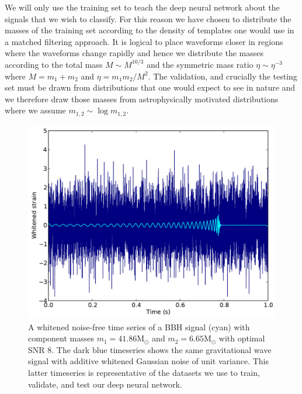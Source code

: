 \documentclass[%
showpacs,
 amsmath,amssymb,
 aps,
 twocolumn,
 prl,
 reprint,
floatfix,
]{revtex4-1}
\begin{document}
%
%
We will only use the training set to teach the deep neural network about the
signals that we wish to classify. For this reason we have chosen to distribute
the masses of the training set according to the density of templates one would
use in a matched filtering approach. It is logical to place waveforms closer in
regions where the waveforms change rapidly and hence we distribute the masses
according to the total mass $M\sim M^{10/3}$ and the symmetric mass ratio
$\eta\sim \eta^{-3}$ where $M=m_{1}+m_{2}$ and $\eta=m_{1}m_{2}/M^{2}$. The
validation, and crucially the testing set must be drawn from distributions that
one would expect to see in nature and we therefore draw those masses from
astrophysically motivated distributions where we assume $m_{1,2}\sim
\log{m_{1,2}}$.   


\begin{figure} 
\includegraphics[width=\columnwidth]{figures/waveform.pdf}
\caption{\label{fig:waveform} A whitened noise-free time series of a \ac{BBH}
signal (cyan) with component masses $m_{1}=41.86\mathrm{M}_{\odot}$ and $m_{2}=6.65\mathrm{M}_{\odot}$
with optimal \ac{SNR} 8. The dark blue timeseries shows the
same gravitational wave signal with additive whitened Gaussian noise of unit
variance. This latter timeseries is representative of the datasets we use to
train, validate, and test our deep neural network.} 
\end{figure}
\end{document}
